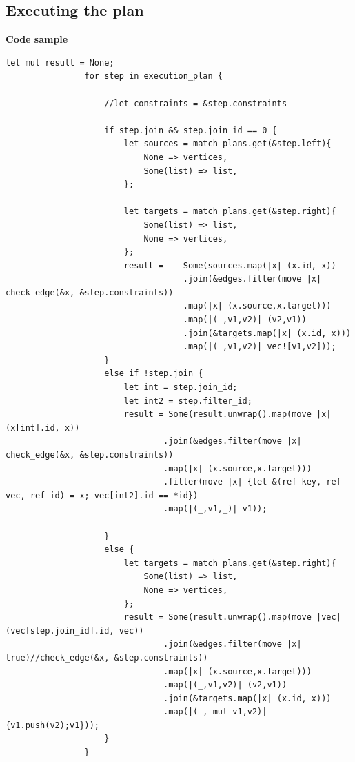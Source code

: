 \documentclass[11pt,singlecolumn]{scrartcl}
\begin{document}
\subsection{Executing the plan}
\textbf{Code sample}
\begin{lstlisting}
let mut result = None;
                for step in execution_plan {

                    //let constraints = &step.constraints 
                    
                    if step.join && step.join_id == 0 {
                        let sources = match plans.get(&step.left){
                            None => vertices,
                            Some(list) => list,
                        };

                        let targets = match plans.get(&step.right){
                            Some(list) => list,
                            None => vertices,
                        };
                        result =    Some(sources.map(|x| (x.id, x))
                                    .join(&edges.filter(move |x| check_edge(&x, &step.constraints))
                                    .map(|x| (x.source,x.target)))
                                    .map(|(_,v1,v2)| (v2,v1))
                                    .join(&targets.map(|x| (x.id, x)))
                                    .map(|(_,v1,v2)| vec![v1,v2]));
                    }
                    else if !step.join {
                        let int = step.join_id;
                        let int2 = step.filter_id;
                        result = Some(result.unwrap().map(move |x| (x[int].id, x))
                                .join(&edges.filter(move |x| check_edge(&x, &step.constraints))
                                .map(|x| (x.source,x.target)))
                                .filter(move |x| {let &(ref key, ref vec, ref id) = x; vec[int2].id == *id})
                                .map(|(_,v1,_)| v1));

                    }
                    else {                 
                        let targets = match plans.get(&step.right){
                            Some(list) => list,
                            None => vertices,
                        };
                        result = Some(result.unwrap().map(move |vec| (vec[step.join_id].id, vec))
                                .join(&edges.filter(move |x| true)//check_edge(&x, &step.constraints))
                                .map(|x| (x.source,x.target)))
                                .map(|(_,v1,v2)| (v2,v1))
                                .join(&targets.map(|x| (x.id, x)))
                                .map(|(_, mut v1,v2)| {v1.push(v2);v1}));   
                    }
                }
 \end{lstlisting} 
\end{document}
